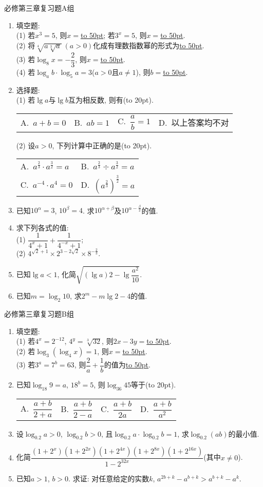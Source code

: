 \documentclass[10pt,a4paper]{article}
\newcommand{\blank}[1]{\underline{\hbox to #1pt{}}}
\newcommand{\bracket}[1]{(\hbox to #1pt{})}
\newcommand{\twoch}[4]{\par\begin{tabular}{p{.46\textwidth}p{.46\textwidth}}
A.~#1& B.~#2\\
C.~#3& D.~#4
\end{tabular}}
\newcommand{\fourch}[4]{\par\begin{tabular}{p{.23\textwidth}p{.23\textwidth}p{.23\textwidth}p{.23\textwidth}}
A.~#1 &B.~#2& C.~#3& D.~#4
\end{tabular}}
\begin{document}
必修第三章复习题A组
\begin{enumerate}[1.]
\item 填空题:\\
(1) 若$x^3=5$, 则$x=$\blank{50}; 若$3^x=5$, 则$x=$\blank{50}.\\
(2) 将$\sqrt[4]{a\sqrt[3]{a}} \ (a>0)$化成有理数指数幂的形式为\blank{50}.\\
(3) 若$\log_8x=-\dfrac 23$, 则$x=$\blank{50}.\\
(4) 若$\log_a b\cdot \log_5 a=3$($a>0$且$a\ne 1$), 则$b=$\blank{50}.
\item 选择题:\\
(1) 若$\lg a$与$\lg b$互为相反数, 则有\bracket{20}.
\fourch{$a+b=0$}{$ab=1$}{$\dfrac ab=1$}{以上答案均不对}
(2) 设$a>0$, 下列计算中正确的是\bracket{20}.
\twoch{$a^\frac{2}{3}\cdot a^\frac{3}{2}=a$}{$a^\frac{2}{3}\div a^\frac{3}{2}=a$}{$a^{-4}\cdot a^4=0$}{$(a^\frac{2}{3})^\frac{3}{2}=a$}
\item 已知$10^\alpha=3$, $10^\beta=4$. 求$10^{\alpha+\beta}$及$10^{\alpha-\frac{\beta}2}$的值.
\item 求下列各式的值:\\
(1) $\dfrac{1}{4^x+1}+\dfrac{1}{4^{-x}+1}$;\\
(2) $4^{\sqrt 2+1}\times 2^{3-2\sqrt 2}\times 8^{-\frac 23}$.
\item 已知$\lg a<1$, 化简$\sqrt{(\lg a)2-\lg \dfrac{a^2}{10}}$.
\item 已知$m=\log_2 10$, 求$2^m-m\lg 2-4$的值. 
\end{enumerate}

必修第三章复习题B组
\begin{enumerate}[1.]
\item 填空题:\\
(1) 若$4^x=2^{-12}$, $4^y=\sqrt[3]{32}$, 则$2x-3y=$\blank{50}.\\
(2) 若$\log_3(\log_4 x)=1$, 则$x=$\blank{50}.\\
(3) 若$3^a=7^b=63$, 则$\dfrac 2a+\dfrac 1b$的值为\blank{50}.\\
\item 已知$\log_{18}9=a$, $18^b=5$, 则$\log_{36}45$等于\bracket{20}.
\fourch{$\dfrac{a+b}{2+a}$}{$\dfrac{a+b}{2-a}$}{$\dfrac{a+b}{2a}$}{$\dfrac{a+b}{a^2}$}
\item 设$\log_{0.2}a>0$, $\log_{0.2}b>0$, 且$\log_{0.2}a\cdot \log_{0.2}b=1$, 求$\log_{0.2}(ab)$的最小值.
\item 化简$\dfrac{(1+2^x)(1+2^{2x})(1+2^{4x})(1+2^{8x})(1+2^{16x})}{1-2^{32x}}$(其中$x\ne 0$).
\item 已知$a>1$, $b>0$. 求证: 对任意给定的实数$k$, $a^{2b+k}-a^{b+k}>a^{b+k}-a^k$.
\end{enumerate}
\end{document}
